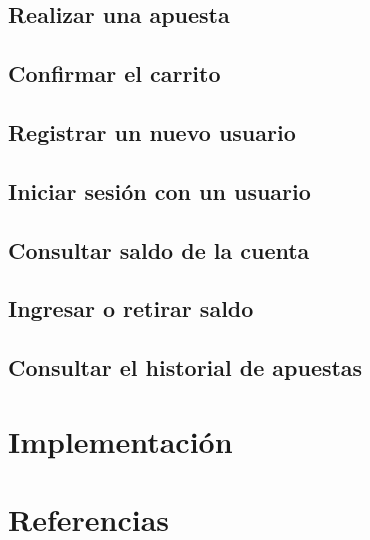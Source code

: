 \documentclass{article}
\begin{document}
\subsection{Realizar una apuesta}
\subsection{Confirmar el carrito}
\subsection{Registrar un nuevo usuario}
\subsection{Iniciar sesión con un usuario}
\subsection{Consultar saldo de la cuenta}
\subsection{Ingresar o retirar saldo}
\subsection{Consultar el historial de apuestas}
\section{Implementación}
\section{Referencias}
\end{document}
